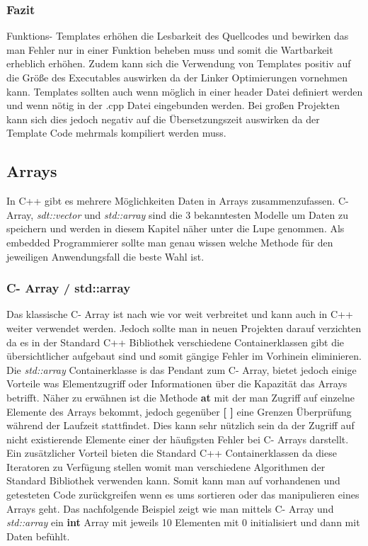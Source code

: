 \documentclass[MES,Master,ngerman]{twbook}%
\begin{document}
\subsubsection{Fazit}
Funktions- Templates erhöhen die Lesbarkeit des Quellcodes und bewirken das man Fehler nur in einer Funktion beheben muss und somit die Wartbarkeit erheblich erhöhen. Zudem kann sich die Verwendung von Templates positiv auf die Größe des Executables auswirken da der Linker Optimierungen vornehmen kann. Templates sollten auch wenn möglich in einer header Datei definiert werden und wenn nötig in der .cpp Datei eingebunden werden. Bei großen Projekten kann sich dies jedoch negativ auf die Übersetzungszeit auswirken da der Template Code mehrmals kompiliert werden muss.
\newpage

\subsection{Arrays}
In C++ gibt es mehrere Möglichkeiten Daten in Arrays zusammenzufassen. C- Array, \textit{sdt::vector} und \textit{std::array} sind die 3 bekanntesten Modelle um Daten zu speichern und werden in diesem Kapitel näher unter die Lupe genommen. Als embedded Programmierer sollte man genau wissen welche Methode für den jeweiligen Anwendungsfall die beste Wahl ist.

\subsubsection{C- Array / std::array}
Das klassische C- Array ist nach wie vor weit verbreitet und kann auch in C++ weiter verwendet werden. Jedoch sollte man in neuen Projekten darauf verzichten da es in der Standard C++ Bibliothek verschiedene Containerklassen gibt die übersichtlicher aufgebaut sind und somit gängige Fehler im Vorhinein eliminieren. Die \textit{std::array} Containerklasse is das Pendant zum C- Array, bietet jedoch einige Vorteile was Elementzugriff oder Informationen über die Kapazität das Arrays betrifft. Näher zu erwähnen ist die Methode \textbf{at} mit der man Zugriff auf einzelne Elemente des Arrays bekommt, jedoch gegenüber \textbf{[ ]} eine Grenzen Überprüfung während der Laufzeit stattfindet. Dies kann sehr nützlich sein da der Zugriff auf nicht existierende Elemente einer der häufigsten Fehler bei C- Arrays darstellt. \newline \newline Ein zusätzlicher Vorteil bieten die Standard C++ Containerklassen da diese Iteratoren zu Verfügung stellen womit man verschiedene Algorithmen der Standard Bibliothek verwenden kann. Somit kann man auf vorhandenen und getesteten Code zurückgreifen wenn es ums sortieren oder das manipulieren eines Arrays geht. \newline \newline Das nachfolgende Beispiel zeigt wie man mittels C- Array und \textit{std::array} ein \textbf{int} Array mit jeweils 10 Elementen mit 0 initialisiert und dann mit Daten befühlt.
\end{document}
